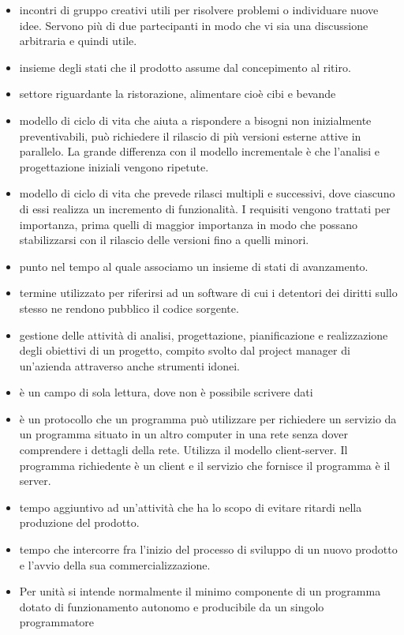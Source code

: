 
\begin{itemize} 

	\item {} incontri di gruppo creativi utili per risolvere problemi o individuare nuove idee. Servono più di due partecipanti in modo che vi sia una discussione arbitraria e quindi utile.
	\item {} insieme degli stati che il prodotto assume dal concepimento al ritiro.
	\item {} settore riguardante la ristorazione, alimentare cioè cibi e bevande
	\item {} modello di ciclo di vita che aiuta a rispondere a bisogni non inizialmente preventivabili, può richiedere il rilascio di più versioni esterne attive in parallelo. La grande differenza con il modello incrementale è che l'analisi e progettazione iniziali vengono ripetute.
	\item {} modello di ciclo di vita che prevede rilasci multipli e successivi, dove ciascuno di essi realizza un incremento di funzionalità. I requisiti vengono trattati per importanza, prima quelli di maggior importanza in modo che possano stabilizzarsi con il rilascio delle versioni fino a quelli minori.
	\item {} punto nel tempo al quale associamo un insieme di stati di avanzamento.
	\item {} termine utilizzato per riferirsi ad un software di cui i detentori dei diritti sullo stesso ne rendono pubblico il codice sorgente.
	\item {} gestione delle attività di analisi, progettazione, pianificazione e realizzazione degli obiettivi di un progetto, compito svolto dal project manager di un'azienda attraverso anche strumenti idonei.
	\item {} è un campo di sola lettura, dove non è possibile scrivere dati
	\item {} è un  protocollo  che un programma può utilizzare per richiedere un servizio da un programma situato in un altro computer in una rete senza dover comprendere i dettagli della rete. Utilizza il   modello client-server. Il programma richiedente è un client e il servizio che fornisce il programma è il server.
	\item {} tempo aggiuntivo ad un'attività che ha lo scopo di evitare ritardi nella produzione del prodotto.
	\item {} tempo che intercorre fra l’inizio del processo di sviluppo di un nuovo prodotto e l’avvio della sua commercializzazione.
	\item {} Per unità si intende normalmente il minimo componente di un programma dotato di funzionamento autonomo e producibile da un singolo programmatore

\end{itemize} 

